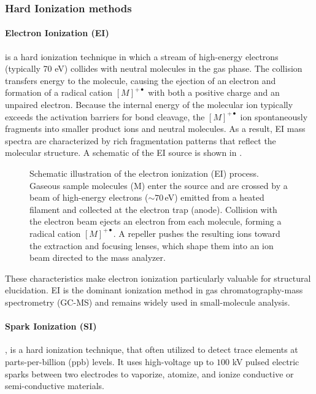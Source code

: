\subsubsection{Hard Ionization methods}

\paragraph{Electron Ionization (EI)} is a hard ionization technique in which a stream of high-energy electrons (typically 70 eV) collides with neutral molecules in the gas phase. \cite[p.~197]{Gross2006}
The collision transfers energy to the molecule, causing the ejection of an electron and formation of a radical cation $[M]^{+\bullet}$ with both a positive charge and an unpaired electron. \cite[p.~194]{Gross2006}
Because the internal energy of the molecular ion typically exceeds the activation barriers for bond cleavage, the $[M]^{+\bullet}$ ion spontaneously fragments into smaller product ions and neutral molecules. \cite[p.~3]{Stoddard2016}
As a result, EI mass spectra are characterized by rich fragmentation patterns that reflect the molecular structure. \cite{Ashyrmamatov2025}
A schematic of the EI source is shown in .

\begin{figure}[H]
    \centering
    \resizebox{0.9\textwidth}{!}{}
    \caption[Schematic of EI ionization]{
        Schematic illustration of the electron ionization (EI) process.
        Gaseous sample molecules (M) enter the source and are crossed by a beam of high-energy electrons ($\sim 70$\,eV) emitted from a heated filament and collected at the electron trap (anode).
        Collision with the electron beam ejects an electron from each molecule, forming a radical cation $[M]^{+\bullet}$.
        A repeller pushes the resulting ions toward the extraction and focusing lenses, which shape them into an ion beam directed to the mass analyzer. \cite[p.18]{Dass2007}
    }
    \label{fig:ei-schematic}
\end{figure}


These characteristics make electron ionization particularly valuable for structural elucidation. \cite{VargasMedina2023}
EI is the dominant ionization method in gas chromatography-mass spectrometry (GC-MS) and remains widely used in small-molecule analysis. \cite[p.~1]{Amirav2021}

\paragraph{Spark Ionization (SI)}, is a hard ionization technique, that often utilized to detect trace elements at parts-per-billion (ppb) levels. \cite[p.~428]{Ganeev2016}
It uses high-voltage up to  $100$ kV pulsed electric sparks between two electrodes to vaporize, atomize, and ionize conductive or semi-conductive materials. \cite[p.~428]{Ganeev2016}

